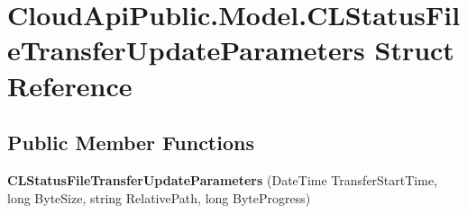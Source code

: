 \hypertarget{struct_cloud_api_public_1_1_model_1_1_c_l_status_file_transfer_update_parameters}{\section{Cloud\-Api\-Public.\-Model.\-C\-L\-Status\-File\-Transfer\-Update\-Parameters Struct Reference}
\label{struct_cloud_api_public_1_1_model_1_1_c_l_status_file_transfer_update_parameters}
}
\subsection*{Public Member Functions}
\begin{DoxyCompactItemize}
\item 
\hypertarget{struct_cloud_api_public_1_1_model_1_1_c_l_status_file_transfer_update_parameters_ae19c0ed5f2ee90fb189332c49efc0772}{{\bfseries C\-L\-Status\-File\-Transfer\-Update\-Parameters} (Date\-Time Transfer\-Start\-Time, long Byte\-Size, string Relative\-Path, long Byte\-Progress)}\label{struct_cloud_api_public_1_1_model_1_1_c_l_status_file_transfer_update_parameters_ae19c0ed5f2ee90fb189332c49efc0772}

\end{DoxyCompactItemize}
